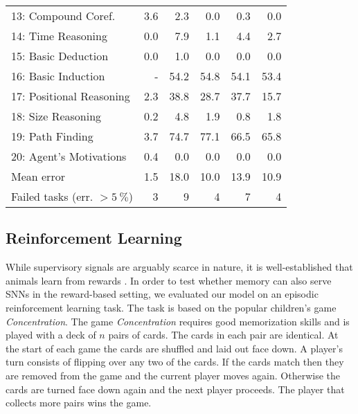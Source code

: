 \documentclass{article}
\begin{document}
\begin{table}
\begin{tabular}{@{}lrrrrr@{}}
13: Compound Coref.                 & 3.6 & 2.3  & 0.0  & 0.3  & 0.0  \\
14: Time Reasoning                  & 0.0 & 7.9  & 1.1  & 4.4  & 2.7  \\
15: Basic Deduction                 & 0.0 & 1.0  & 0.0  & 0.0  & 0.0  \\
16: Basic Induction                 & -   & 54.2 & 54.8 & 54.1 & 53.4 \\
17: Positional Reasoning            & 2.3 & 38.8 & 28.7 & 37.7 & 15.7 \\
18: Size Reasoning                  & 0.2 & 4.8  & 1.9  & 0.8  & 1.8  \\
19: Path Finding                    & 3.7 & 74.7 & 77.1 & 66.5 & 65.8 \\
20: Agent's Motivations             & 0.4 & 0.0  & 0.0  & 0.0  & 0.0  \\
\cmidrule(lr){2-2} \cmidrule(lr){3-4} \cmidrule(l){5-6}
Mean error                          & 1.5 & 18.0 & 10.0 & 13.9 & 10.9 \\
Failed tasks (err. $>\SI{5}{\percent}$) & 3 & 9 & 4    & 7 & 4 \\
\bottomrule
\end{tabular}
\label{tab:tab1}
\end{table}

\subsection{Reinforcement Learning}
\label{sec:results-reinforcement_learning}
While supervisory signals are arguably scarce in nature, it is well-established that animals learn from rewards \cite{schultz2002getting}. In order to test whether memory can also serve SNNs in the reward-based setting, we evaluated our model on an episodic reinforcement learning task. The task is based on the popular children's game \emph{Concentration}. The game \emph{Concentration} requires good memorization skills and is played with a deck of $n$ pairs of cards. The cards in each pair are identical. At the start of each game the cards are shuffled and laid out face down. A player's turn consists of flipping over any two of the cards. If the cards match then they are removed from the game and the current player moves again. Otherwise the cards are turned face down again and the next player proceeds. The player that collects more pairs wins the game. 
\end{document}
